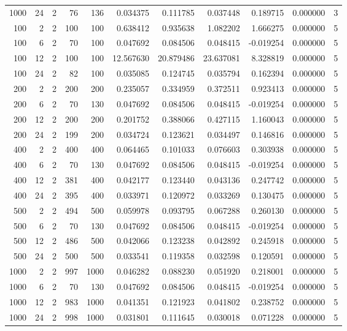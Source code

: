 \begin{table}
\begin{tabular}{rrrrrrrrrrr}
1000 & 24 & 2 & 76 & 136 & 0.034375 & 0.111785 & 0.037448 & 0.189715 & 0.000000 & 3 \\
100 & 2 & 2 & 100 & 100 & 0.638412 & 0.935638 & 1.082202 & 1.666275 & 0.000000 & 5 \\
100 & 6 & 2 & 70 & 100 & 0.047692 & 0.084506 & 0.048415 & -0.019254 & 0.000000 & 5 \\
100 & 12 & 2 & 100 & 100 & 12.567630 & 20.879486 & 23.637081 & 8.328819 & 0.000000 & 5 \\
100 & 24 & 2 & 82 & 100 & 0.035085 & 0.124745 & 0.035794 & 0.162394 & 0.000000 & 5 \\
200 & 2 & 2 & 200 & 200 & 0.235057 & 0.334959 & 0.372511 & 0.923413 & 0.000000 & 5 \\
200 & 6 & 2 & 70 & 130 & 0.047692 & 0.084506 & 0.048415 & -0.019254 & 0.000000 & 5 \\
200 & 12 & 2 & 200 & 200 & 0.201752 & 0.388066 & 0.427115 & 1.160043 & 0.000000 & 5 \\
200 & 24 & 2 & 199 & 200 & 0.034724 & 0.123621 & 0.034497 & 0.146816 & 0.000000 & 5 \\
400 & 2 & 2 & 400 & 400 & 0.064465 & 0.101033 & 0.076603 & 0.303938 & 0.000000 & 5 \\
400 & 6 & 2 & 70 & 130 & 0.047692 & 0.084506 & 0.048415 & -0.019254 & 0.000000 & 5 \\
400 & 12 & 2 & 381 & 400 & 0.042177 & 0.123440 & 0.043136 & 0.247742 & 0.000000 & 5 \\
400 & 24 & 2 & 395 & 400 & 0.033971 & 0.120972 & 0.033269 & 0.130475 & 0.000000 & 5 \\
500 & 2 & 2 & 494 & 500 & 0.059978 & 0.093795 & 0.067288 & 0.260130 & 0.000000 & 5 \\
500 & 6 & 2 & 70 & 130 & 0.047692 & 0.084506 & 0.048415 & -0.019254 & 0.000000 & 5 \\
500 & 12 & 2 & 486 & 500 & 0.042066 & 0.123238 & 0.042892 & 0.245918 & 0.000000 & 5 \\
500 & 24 & 2 & 500 & 500 & 0.033541 & 0.119358 & 0.032598 & 0.120591 & 0.000000 & 5 \\
1000 & 2 & 2 & 997 & 1000 & 0.046282 & 0.088230 & 0.051920 & 0.218001 & 0.000000 & 5 \\
1000 & 6 & 2 & 70 & 130 & 0.047692 & 0.084506 & 0.048415 & -0.019254 & 0.000000 & 5 \\
1000 & 12 & 2 & 983 & 1000 & 0.041351 & 0.121923 & 0.041802 & 0.238752 & 0.000000 & 5 \\
1000 & 24 & 2 & 998 & 1000 & 0.031801 & 0.111645 & 0.030018 & 0.071228 & 0.000000 & 5 \\

\end{tabular}
\end{table}
